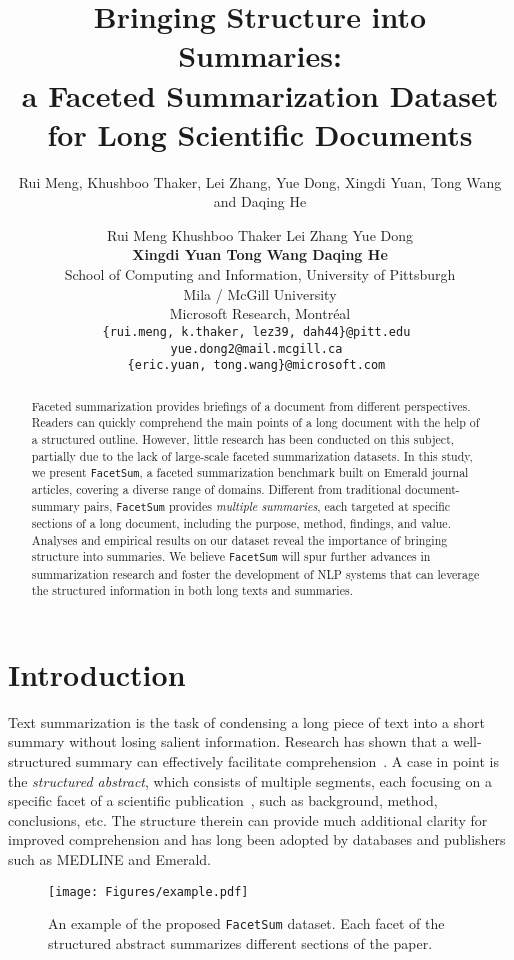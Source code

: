 \documentclass[11pt,a4paper]{article}
\title{Bringing Structure into Summaries: \\ a Faceted Summarization Dataset for Long Scientific Documents}
\author{Rui Meng, Khushboo Thaker, Lei Zhang, Yue Dong, Xingdi Yuan, Tong Wang and Daqing He}
\author{Rui Meng \:\:\:\: Khushboo Thaker \:\:\:\: Lei Zhang \:\:\:\: Yue Dong \:\:\:\: \\ \textbf{Xingdi Yuan \:\:\:\: Tong Wang \:\:\:\: Daqing He}\\
School of Computing and Information, University of Pittsburgh \\
 Mila / McGill University \\
Microsoft Research, Montr\'{e}al \\
{\small \tt \{rui.meng, k.thaker, lez39, dah44\}@pitt.edu } \\
{\small \tt yue.dong2@mail.mcgill.ca } \\
{\small \tt \{eric.yuan, tong.wang\}@microsoft.com }
}
\date{}
\newcommand{\ours}{\texttt{FacetSum}\xspace}
\begin{document}
\maketitle

\begin{abstract}
Faceted summarization provides briefings of a document from different perspectives. Readers can quickly comprehend the main points of a long document with the help of a structured outline. However, little research has been conducted on this subject, partially due to the lack of large-scale faceted summarization datasets.
In this study, we present \ours, a faceted summarization benchmark built on Emerald journal articles, covering a diverse range of domains.
Different from traditional document-summary pairs, \ours provides \textit{multiple summaries}, each targeted at specific sections
of a long document, including the purpose, method, findings, and value.
Analyses and empirical results on our dataset reveal the importance of bringing structure into summaries.
We believe \ours will spur further advances in summarization research and foster the development of NLP systems that can leverage the structured information in both long texts and summaries.






\end{abstract}

\section{Introduction}
\label{section:intro}








Text summarization is the task of condensing a long piece of text into a short summary without losing salient information.
Research has shown that a well-structured summary 
can effectively facilitate comprehension~\cite{hartley1996obtaining,hartley1997structured}.
A case in point is the \textit{structured abstract}, which consists of multiple segments, each focusing on a specific facet of a scientific publication~\cite{hartley2014current}, such as background, method, conclusions, etc.
The structure therein can provide much additional clarity for improved comprehension and  has long been adopted by databases and publishers such as MEDLINE and Emerald.


\begin{figure}[t!]
    \centering
    \texttt{[image: Figures/example.pdf]}
    \caption{An example of the proposed \ours dataset. Each facet of the structured abstract summarizes different sections of the paper.
    }
    \label{fig:example}
\end{figure}
\end{document}
